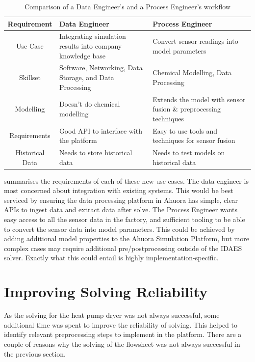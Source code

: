 \begin{table}[ht]
    \centering
    \caption{Comparison of a Data Engineer's and a Process Engineer's workflow}
    \begin{tabular}{|c|p{}|p{}|}
        \hline
        \textbf{Requirement} & \textbf{Data Engineer} & \textbf{Process Engineer} \\
        \hline
        Use Case & Integrating simulation results into company knowledge base & Convert sensor readings into model parameters \\
        \hline
        Skillset & Software, Networking, Data Storage, and Data Processing  & Chemical Modelling, Data Processing \\
        \hline
        Modelling & Doesn't do chemical modelling & Extends the model with sensor fusion \& preprocessing techniques\\
        \hline
        Requirements & Good API to interface with the platform & Easy to use tools and techniques for sensor fusion \\
        \hline
        Historical Data & Needs to store historical data & Needs to test models on historical data \\
        \hline
    \end{tabular}
    \label{tab:morerequirements}
\end{table}


 summarises the requirements of each of these new use cases. The data engineer is most concerned about integration with existing systems. This would be best serviced by ensuring the data processing platform in Ahuora has simple, clear APIs to ingest data and extract data after solve. The Process Engineer wants easy access to all the sensor data in the factory, and sufficient tooling to be able to convert the sensor data into model parameters. This could be achieved by adding additional model properties to the Ahuora Simulation Platform, but more complex cases may require additional pre/postprocessing outside of the IDAES solver. Exactly what this could entail is highly implementation-specific.






\section{Improving Solving Reliability} \label{sec:solvingreliability}

As the solving for the heat pump dryer was not always successful, some additional time was spent to improve the reliability of solving.
This helped to identify relevant preprocessing steps to implement in the platform.
There are a couple of reasons why the solving of the flowsheet was not always successful in the previous section. 

